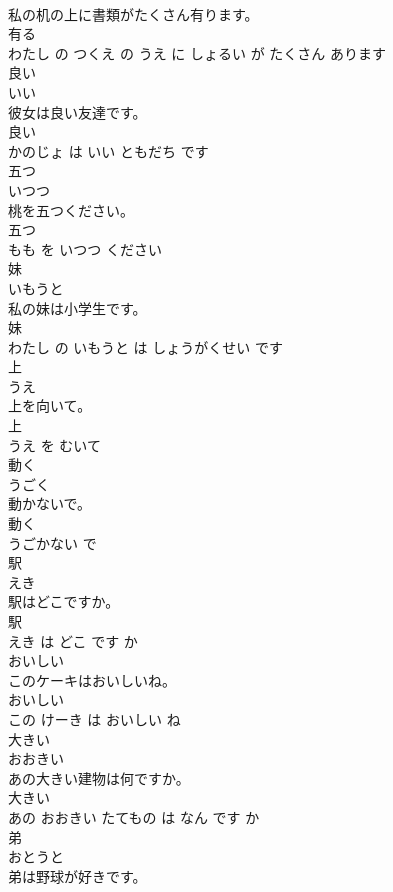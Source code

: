 \documentclass[8pt]{extreport}
\begin{document}
\begin{CJK}{UTF8}{min}
\\	私の机の上に書類がたくさん有ります。	
\\	有る 
\\	わたし の つくえ の うえ に しょるい が たくさん あります			
\\	良い	
\\	いい			
\\	彼女は良い友達です。	
\\	良い 
\\	かのじょ は いい ともだち です			
\\	五つ	
\\	いつつ			
\\	桃を五つください。	
\\	五つ 
\\	もも を いつつ ください			
\\	妹	
\\	いもうと			
\\	私の妹は小学生です。	
\\	妹 
\\	わたし の いもうと は しょうがくせい です			
\\	上	
\\	うえ			
\\	上を向いて。	
\\	上 
\\	うえ を むいて			
\\	動く	
\\	うごく			
\\	動かないで。	
\\	動く 
\\	うごかない で			
\\	駅	
\\	えき			
\\	駅はどこですか。	
\\	駅 
\\	えき は どこ です か			
\\	おいしい	
\\	このケーキはおいしいね。	
\\	おいしい 
\\	この けーき は おいしい ね			
\\	大きい	
\\	おおきい			
\\	あの大きい建物は何ですか。	
\\	大きい 
\\	あの おおきい たてもの は なん です か			
\\	弟	
\\	おとうと			
\\	弟は野球が好きです。	

\end{CJK}
\end{document}
